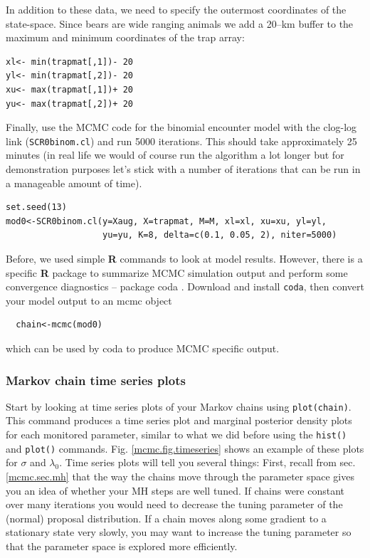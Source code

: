  In addition to these data, we need to specify
the outermost coordinates of the state-space. Since bears are wide
ranging animals we add a 20--km buffer to the maximum and minimum
coordinates of the trap array:

\begin{verbatim}
xl<- min(trapmat[,1])- 20
yl<- min(trapmat[,2])- 20
xu<- max(trapmat[,1])+ 20
yu<- max(trapmat[,2])+ 20
\end{verbatim}

Finally, use the MCMC code for the binomial encounter model
with the clog-log link  ({\tt SCR0binom.cl}) and run 5000 iterations. This should take
approximately 25 minutes (in real life we would of course run the algorithm a lot longer but for demonstration purposes let's stick with a number of iterations that can be run in a manageable amount of time).
\begin{verbatim}
set.seed(13)
mod0<-SCR0binom.cl(y=Xaug, X=trapmat, M=M, xl=xl, xu=xu, yl=yl,
                   yu=yu, K=8, delta=c(0.1, 0.05, 2), niter=5000)
\end{verbatim}

Before, we used simple {\bf R} commands to look at model results.
However, there is a specific {\bf R} package to summarize MCMC
simulation output and perform some convergence diagnostics -- package
coda \citep{plummer_etal:2006}. Download and install {\tt coda}, then
convert your model output to an mcmc object
\begin{verbatim}
  chain<-mcmc(mod0)
\end{verbatim}
which can be used by coda to produce MCMC specific output.

\subsubsection{Markov chain time series plots}

Start by looking at time series plots of your Markov chains using
\verb#plot(chain)#. This command produces a time series plot and
 marginal posterior density plots for each monitored parameter,
 similar to what we did before using the \verb#hist()# and \verb#plot()#
 commands. Fig. \ref{mcmc.fig.timeseries} shows an example of these plots for $\sigma$ and $\lambda_0$. Time series plots will tell
 you several things:
First, recall from sec. \ref{mcmc.sec.mh} that the way the chains move
through the parameter space gives you an idea of whether your MH
steps are well tuned. If chains were constant over many iterations
you would need to decrease the tuning parameter of the (normal)
proposal distribution. If a chain moves along some gradient to a
stationary state very slowly, you may want to increase the tuning
parameter so that the parameter space is explored more efficiently.


